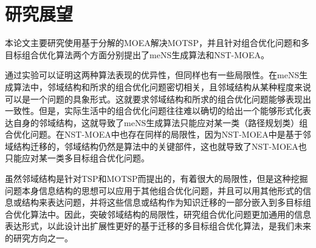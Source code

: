 \section{研究展望}
\label{sec:future}
本论文主要研究使用基于分解的MOEA解决MOTSP，并且针对组合优化问题和多目标组合优化算法两个方面分别提出了meNS生成算法和NST-MOEA。
\par
通过实验可以证明这两种算法表现的优异性，但同样也有一些局限性。在meNS生成算法中，邻域结构和所求的组合优化问题密切相关，且邻域结构从某种程度来说可以是一个问题的具象形式。这就要求邻域结构和所求的组合优化问题能够表现出一致性。但是，实际生活中的组合优化问题往往难以确切的给出一个能够形式化表达自身的邻域结构，这就导致了meNS生成算法只能应对某一类（路径规划类）组合优化问题。在NST-MOEA中也存在同样的局限性，因为NST-MOEA中是基于邻域结构迁移的，邻域结构仍然是算法中的关键部件，这也就导致了NST-MOEA也只能应对某一类多目标组合优化问题。
\par
虽然邻域结构是针对TSP和MOTSP而提出的，有着很大的局限性，但是这种挖掘问题本身信息结构的思想可以应用于其他组合优化问题，并且可以用其他形式的信息或结构来表达问题，并将这些信息或结构作为知识迁移的一部分嵌入到多目标组合优化算法中。因此，突破邻域结构的局限性，研究组合优化问题更加通用的信息表达形式，以此设计出扩展性更好的基于迁移的多目标组合优化算法，是我们未来的研究方向之一。